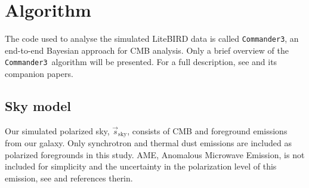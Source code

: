 \documentclass[twocolumn]{aa}
\def\commanderthree{\texttt{Commander3}}
\newcommand{\s}[0]{\vec{s}}
\begin{document}



\section{Algorithm}
\label{sec:Algorithm}


The code used to analyse the simulated LiteBIRD data is called \commanderthree, an end-to-end Bayesian approach for CMB analysis. Only a brief overview of the \commanderthree\ algorithm will be presented. For a full description, see \citet{bp01} and its companion papers. 


\subsection{Sky model}
\label{sss:SkyModel}
Our simulated polarized sky, $\s_{\mathrm{sky}}$, consists of CMB and foreground emissions from our galaxy. Only synchrotron and thermal dust emissions are included as polarized foregrounds in this study. AME, Anomalous Microwave Emission, is not included for simplicity and the uncertainty in the polarization level of this emission, see \citet{bp15} and references therin. 
\end{document}
